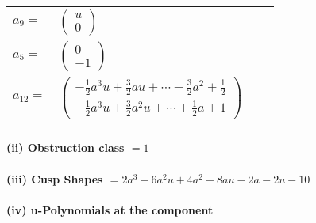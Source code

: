 \documentclass[1p]{elsarticle_modified}
\theoremstyle{definition}
\begin{document}
\begin{tabular}{m{7pt} m{180pt} m{7pt} m{180pt} }
\flushright $a_{9}=$&$\begin{pmatrix}u\\0\end{pmatrix}$ \\
\flushright $a_{5}=$&$\begin{pmatrix}0\\-1\end{pmatrix}$ \\
\flushright $a_{12}=$&$\begin{pmatrix}-\frac{1}{2} a^3 u+\frac{3}{2} a u+\cdots-\frac{3}{2} a^2+\frac{1}{2}\\-\frac{1}{2} a^3 u+\frac{3}{2} a^2 u+\cdots+\frac{1}{2} a+1\end{pmatrix}$\\&\end{tabular}
\flushleft \textbf{(ii) Obstruction class $= 1$}\\~\\
\flushleft \textbf{(iii) Cusp Shapes $= 2 a^3-6 a^2 u+4 a^2-8 a u-2 a-2 u-10$}\\~\\
\newpage\renewcommand{\arraystretch}{1}
\flushleft \textbf{(iv) u-Polynomials at the component}\newline \\
\end{document}
